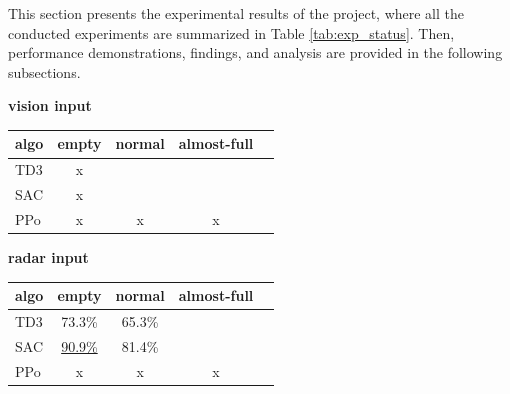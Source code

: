 \documentclass{article}
\begin{document}
This section presents the experimental results of the project, where all the conducted experiments are summarized in Table \ref{tab:exp_status}. Then, performance demonstrations, findings, and analysis are provided in the following subsections.

\begin{table}[h]
  \centering
  \begin{minipage}[t]{0.48\linewidth}
    \centering
    \textbf{vision input}
    \vspace{0.5ex}
    \begin{tabular}{@{}lcccc@{}}
      \toprule
      algo & empty & normal & almost-full \\
      \midrule
      TD3  & x     &        &             \\
      SAC  & x     &        &             \\
      PPo  & x     & x      & x           \\
      \bottomrule
    \end{tabular}
  \end{minipage}
  \hfill
  \begin{minipage}[t]{0.48\linewidth}
    \centering
    \textbf{radar input}
    \vspace{0.5ex}
    \begin{tabular}{@{}lcccc@{}}
      \toprule
      algo & empty              & normal & almost-full \\
      \midrule
      TD3  & 73.3\%             & 65.3\% &             \\
      SAC  & \underline{90.9\%} & 81.4\% &             \\
      PPo  & x                  & x      & x           \\
      \bottomrule
    \end{tabular}
  \end{minipage}

  \vspace{1.5em}


\end{table}
\end{document}
